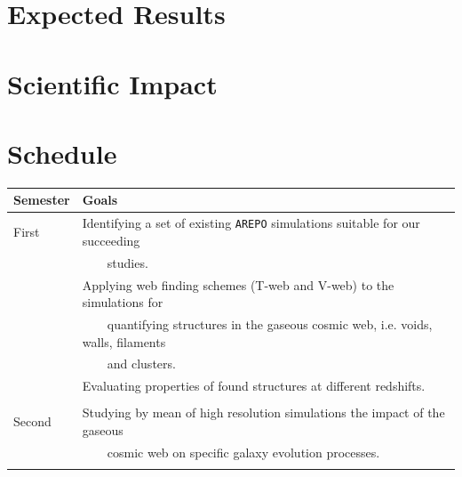 \documentclass[a4,useAMS,usenatbib,usegraphicx,12pt]{article}
\begin{document}
\section{Expected Results}


\section{Scientific Impact}


\section{Schedule}


\begin{table}[h]
\begin{flushleft}
\begin{center}
  \begin{tabular}{l  l} \hline\hline
	\centering\textbf{Semester} & \textbf{Goals} \\ \hline
	First  
	& \tabitem Identifying a set of existing \texttt{AREPO} simulations suitable 
	for our succeeding \\
	& \ \ \ \ studies. \\
	& \tabitem Applying web finding schemes (T-web and V-web) to the simulations 
	for\\
	& \ \ \ \ quantifying structures in the gaseous cosmic web, i.e. voids, walls, 
	filaments\\
	& \ \ \ \ and clusters.\\
	& \tabitem Evaluating properties of found structures at different redshifts.\\
	\\
	Second
	& \tabitem Studying by mean of high resolution simulations the impact of the 
	gaseous\\
	& \ \ \ \ cosmic web on specific galaxy evolution processes.\\
	\\	
	
	\hline\hline
  \end{tabular}  
\end{center}
\end{flushleft}
\end{table}


\newpage

\renewcommand{\bibname}{8\ \ \ \ Bibliography}
\small

\end{document}
